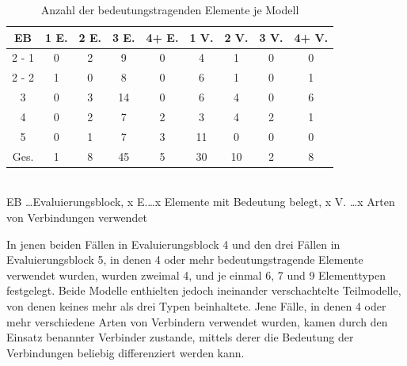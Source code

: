 \begin{table}[htbp]
	\centering
	\caption{Anzahl der bedeutungstragenden Elemente je Modell}
\begin{tabular}{| c || c | c | c | c || c | c | c | c |}
  \hline
   EB & 1 E. & 2 E. & 3 E. & 4+ E. & 1 V. & 2 V. & 3 V. & 4+ V. \\ \hline
   2 - 1 & 0 & 2 &  9 & 0 &  4 &  1 & 0 & 0 \\ 
   2 - 2 & 1 & 0 &  8 & 0 &  6 &  1 & 0 & 1 \\ 
   3     & 0 & 3 & 14 & 0 &  6 &  4 & 0 & 6 \\ 
   4     & 0 & 2 &  7 & 2 &  3 &  4 & 2 & 1 \\ 
   5     & 0 & 1 &  7 & 3 & 11 &  0 & 0 & 0 \\ \hline
   Ges.  & 1 & 8 & 45 & 5 & 30 & 10 & 2 & 8 \\ \hline
\end{tabular} \\
\footnotesize EB \ldots Evaluierungsblock, x E.\ldots x Elemente mit Bedeutung belegt, x V. \ldots x Arten von Verbindungen verwendet
	\label{tab:anzahl_bedeutungstragende_elemente}
\end{table}
 
In jenen beiden Fällen in Evaluierungsblock 4 und den drei Fällen in Evaluierungsblock 5, in denen 4 oder mehr bedeutungstragende Elemente verwendet wurden, wurden zweimal 4, und je einmal 6, 7 und 9 Elementtypen festgelegt. Beide Modelle enthielten jedoch ineinander verschachtelte Teilmodelle, von denen keines mehr als drei Typen beinhaltete. Jene Fälle, in denen 4 oder mehr verschiedene Arten von Verbindern verwendet wurden, kamen durch den Einsatz benannter Verbinder zustande, mittels derer die Bedeutung der Verbindungen beliebig differenziert werden kann.

